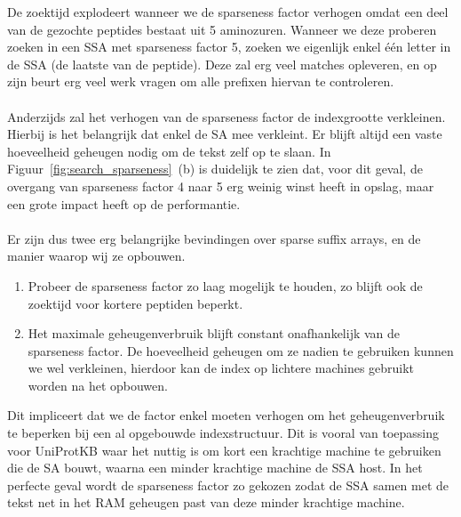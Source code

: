 De zoektijd explodeert wanneer we de sparseness factor verhogen omdat een deel van de gezochte peptides bestaat uit 5 aminozuren.
Wanneer we deze proberen zoeken in een SSA met sparseness factor 5, zoeken we eigenlijk enkel één letter in de SSA (de laatste van de peptide).
Deze zal erg veel matches opleveren, en op zijn beurt erg veel werk vragen om alle prefixen hiervan te controleren.
\\ \\
Anderzijds zal het verhogen van de sparseness factor de indexgrootte verkleinen.
Hierbij is het belangrijk dat enkel de SA mee verkleint.
Er blijft altijd een vaste hoeveelheid geheugen nodig om de tekst zelf op te slaan.
In Figuur~\ref{fig:search_sparseness}~(b) is duidelijk te zien dat, voor dit geval, de overgang van sparseness factor 4 naar 5 erg weinig winst heeft in opslag, maar een grote impact heeft op de performantie.
\\ \\
Er zijn dus twee erg belangrijke bevindingen over sparse suffix arrays, en de manier waarop wij ze opbouwen.
\begin{enumerate}
    \item Probeer de sparseness factor zo laag mogelijk te houden, zo blijft ook de zoektijd voor kortere peptiden beperkt.
    \item Het maximale geheugenverbruik blijft constant onafhankelijk van de sparseness factor.
    De hoeveelheid geheugen om ze nadien te gebruiken kunnen we wel verkleinen, hierdoor kan de index op lichtere machines gebruikt worden na het opbouwen.
\end{enumerate}

Dit impliceert dat we de factor enkel moeten verhogen om het geheugenverbruik te beperken bij een al opgebouwde indexstructuur.
Dit is vooral van toepassing voor UniProtKB waar het nuttig is om kort een krachtige machine te gebruiken die de SA bouwt, waarna een minder krachtige machine de SSA host.
In het perfecte geval wordt de sparseness factor zo gekozen zodat de SSA samen met de tekst net in het RAM geheugen past van deze minder krachtige machine.

